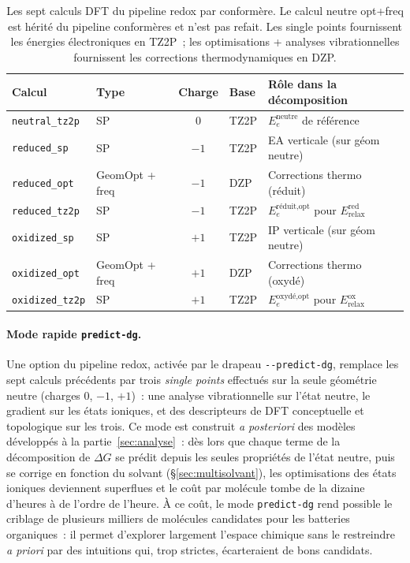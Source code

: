 \begin{table}[htbp]
\centering
\caption{Les sept calculs DFT du pipeline redox par conformère. Le calcul neutre opt+freq est hérité du pipeline conformères et n'est pas refait. Les single points fournissent les énergies électroniques en TZ2P~; les optimisations + analyses vibrationnelles fournissent les corrections thermodynamiques en DZP.}
\label{tab:redox_jobs}
\footnotesize
\begin{tabular}{l l c l l}
\toprule
\textbf{Calcul} & \textbf{Type} & \textbf{Charge} & \textbf{Base} & \textbf{Rôle dans la décomposition} \\
\midrule
\texttt{neutral\_tz2p}   & SP                & 0    & TZ2P & $E_e^{\text{neutre}}$ de référence \\
\midrule
\texttt{reduced\_sp}     & SP                & $-1$ & TZ2P & EA verticale (sur géom neutre) \\
\texttt{reduced\_opt}    & GeomOpt + freq    & $-1$ & DZP  & Corrections thermo (réduit) \\
\texttt{reduced\_tz2p}   & SP                & $-1$ & TZ2P & $E_e^{\text{réduit,opt}}$ pour $E_{\text{relax}}^{\text{red}}$ \\
\midrule
\texttt{oxidized\_sp}    & SP                & $+1$ & TZ2P & IP verticale (sur géom neutre) \\
\texttt{oxidized\_opt}   & GeomOpt + freq    & $+1$ & DZP  & Corrections thermo (oxydé) \\
\texttt{oxidized\_tz2p}  & SP                & $+1$ & TZ2P & $E_e^{\text{oxydé,opt}}$ pour $E_{\text{relax}}^{\text{ox}}$ \\
\bottomrule
\end{tabular}
\end{table}

\paragraph{Mode rapide \texttt{predict-dg}.}
Une option du pipeline redox, activée par le drapeau \texttt{-{}-predict-dg}, remplace les sept calculs précédents par trois \emph{single points} effectués sur la seule géométrie neutre (charges $0$, $-1$, $+1$)~: une analyse vibrationnelle sur l'état neutre, le gradient sur les états ioniques, et des descripteurs de DFT conceptuelle et topologique sur les trois. Ce mode est construit \emph{a posteriori} des modèles développés à la partie~\ref{sec:analyse}~: dès lors que chaque terme de la décomposition de $\Delta G$ se prédit depuis les seules propriétés de l'état neutre, puis se corrige en fonction du solvant (§\ref{sec:multisolvant}), les optimisations des états ioniques deviennent superflues et le coût par molécule tombe de la dizaine d'heures à de l'ordre de l'heure. À ce coût, le mode \texttt{predict-dg} rend possible le criblage de plusieurs milliers de molécules candidates pour les batteries organiques~: il permet d'explorer largement l'espace chimique sans le restreindre \emph{a priori} par des intuitions qui, trop strictes, écarteraient de bons candidats.


